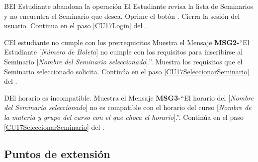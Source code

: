 		\begin{UCtrayectoriaA}{B}{El Estudiante abandona la operación}
			\UCpaso El Estudiante revisa la lista de Seminarios y no encuentra el Seminario que desea.
			\UCpaso[\UCactor] Oprime el botón .
			\UCpaso Cierra la sesión del usuario.
			\UCpaso Continua en el paso \ref{CU17Login} del .
		\end{UCtrayectoriaA}

		\begin{UCtrayectoriaA}{C}{El estudiante no cumple con los prerrequicitos}
			\UCpaso Muestra el Mensaje {\bf MSG2-}``El Estudiante [{\em Número de Boleta}] no cumple con los requisitos para inscribirse al Seminario [{\em Nombre del Seminario seleccionado}].''.
			\UCpaso Muestra los requisitos que el Seminario seleccionado solicita.
			\UCpaso Continúa en el paso \ref{CU17SeleccionarSeminario} del .
		\end{UCtrayectoriaA}

		\begin{UCtrayectoriaA}{D}{El horario es incompatible.}
			\UCpaso Muestra el Mensaje {\bf MSG3-}``El horario del [{\em Nombre del Seminario seleccionado}] no es compatible con el horario del curso [{\em Nombre de la materia y grupo del curso con el que choca el horario}].''.
			\UCpaso Continúa en el paso \ref{CU17SeleccionarSeminario} del .
		\end{UCtrayectoriaA}

\subsection{Puntos de extensión}
		
		
		
